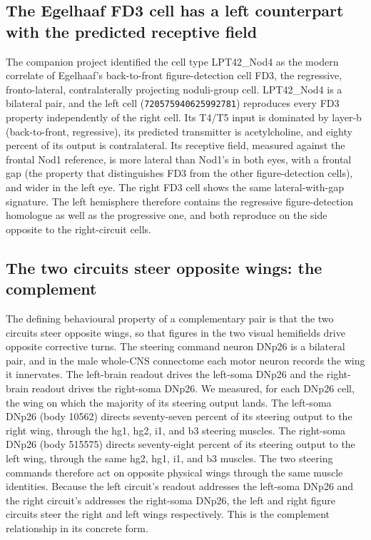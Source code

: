 \documentclass[11pt]{article}
\newcommand{\rid}[1]{\texttt{\small #1}}
\begin{document}
\subsection{The Egelhaaf FD3 cell has a left counterpart with the predicted receptive field}

The companion project identified the cell type LPT42\_Nod4 as the modern correlate of Egelhaaf's
back-to-front figure-detection cell FD3, the regressive, fronto-lateral, contralaterally
projecting noduli-group cell. LPT42\_Nod4 is a bilateral pair, and the left cell
(\rid{720575940625992781}) reproduces every FD3 property independently of the right cell. Its
T4/T5 input is dominated by layer-b (back-to-front, regressive), its predicted transmitter is
acetylcholine, and eighty percent of its output is contralateral. Its receptive field, measured
against the frontal Nod1 reference, is more lateral than Nod1's in both eyes, with a frontal gap
(the property that distinguishes FD3 from the other figure-detection cells), and wider in the
left eye. The right FD3 cell shows the same lateral-with-gap signature. The left hemisphere
therefore contains the regressive figure-detection homologue as well as the progressive one, and
both reproduce on the side opposite to the right-circuit cells.

\subsection{The two circuits steer opposite wings: the complement}

The defining behavioural property of a complementary pair is that the two circuits steer opposite
wings, so that figures in the two visual hemifields drive opposite corrective turns. The steering
command neuron DNp26 is a bilateral pair, and in the male whole-CNS connectome each motor neuron
records the wing it innervates. The left-brain readout drives the left-soma DNp26 and the
right-brain readout drives the right-soma DNp26. We measured, for each DNp26 cell, the wing on
which the majority of its steering output lands. The left-soma DNp26 (body 10562) directs
seventy-seven percent of its steering output to the right wing, through the hg1, hg2, i1, and b3
steering muscles. The right-soma DNp26 (body 515575) directs seventy-eight percent of its
steering output to the left wing, through the same hg2, hg1, i1, and b3 muscles. The two
steering commands therefore act on opposite physical wings through the same muscle identities.
Because the left circuit's readout addresses the left-soma DNp26 and the right circuit's
addresses the right-soma DNp26, the left and right figure circuits steer the right and left wings
respectively. This is the complement relationship in its concrete form.
\end{document}
